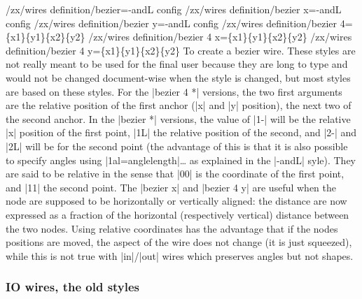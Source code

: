\documentclass[a4paper]{ltxdoc}
\begin{document}
{\begin{pgfmanualentry}
  \makeatletter
  \def\extrakeytext{style, }
  \extractkey/zx/wires definition/bezier=-andL config \@nil%
  \extractkey/zx/wires definition/bezier x=-andL config \@nil%
  \extractkey/zx/wires definition/bezier y=-andL config \@nil%
  \extractkey/zx/wires definition/bezier 4=\{x1\}\{y1\}\{x2\}\{y2\} \@nil%
  \extractkey/zx/wires definition/bezier 4 x=\{x1\}\{y1\}\{x2\}\{y2\} \@nil%
  \extractkey/zx/wires definition/bezier 4 y=\{x1\}\{y1\}\{x2\}\{y2\} \@nil%
  \makeatother
  \pgfmanualbody
  To create a bezier wire. These styles are not really meant to be used for the final user because they are long to type and would not be changed document-wise when the style is changed, but most styles are based on these styles. For the |bezier 4 *| versions, the two first arguments are the relative position of the first anchor (|x| and |y| position), the next two of the second anchor. In the |bezier *| versions, the value of |1-| will be the relative |x| position of the first point, |1L| the relative position of the second, and |2-| and |2L| will be for the second point (the advantage of this is that it is also possible to specify angles using |1al={angle}{length}|\dots{} as explained in the |-andL| syle). They are said to be relative in the sense that |{0}{0}| is the coordinate of the first point, and |{1}{1}| the second point. The |bezier x| and |bezier 4 y| are useful when the node are supposed to be horizontally or vertically aligned: the distance are now expressed as a fraction of the horizontal (respectively vertical) distance between the two nodes. Using relative coordinates has the advantage that if the nodes positions are moved, the aspect of the wire does not change (it is just squeezed), while this is not true with |in|/|out| wires which preserves angles but not shapes.
\end{pgfmanualentry}


\subsubsection{IO wires, the old styles}\label{subsub:IOwires}

}
\end{document}
